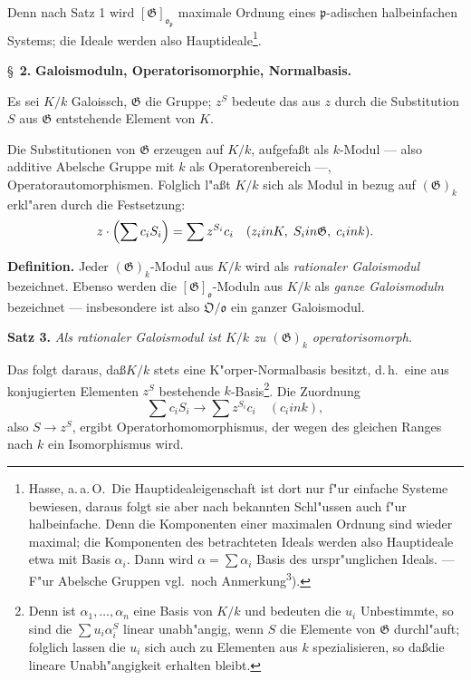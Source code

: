 \documentclass[12pt,a4paper]{article}
\theoremstyle{plain}
\begin{document}
Denn nach Satz 1 wird $[\mathfrak{G}]_{\mathfrak{o}_\mathfrak{p}}$ maximale Ordnung eines $\mathfrak{p}$-adischen halbeinfachen Systems; die Ideale werden also Hauptideale\footnote{Hasse, a.\,a.\,O.\ Die Hauptidealeigenschaft ist dort nur f"ur einfache Systeme bewiesen, daraus folgt sie aber nach bekannten Schl"ussen auch f"ur halbeinfache. Denn die Komponenten einer maximalen Ordnung sind wieder maximal; die Komponenten des betrachteten Ideals werden also Hauptideale etwa mit Basis $\alpha_i$. Dann wird $\alpha = \sum \alpha_i$ Basis des urspr"unglichen Ideals. --- F"ur Abelsche Gruppen vgl.\ noch Anmerkung\textsuperscript{3}).}.

\newpage
\S~\textbf{2.}
\textbf{Galoismoduln, Operatorisomorphie, Normalbasis.}

\smallskip

Es sei $K/k$ Galoissch, $\mathfrak{G}$ die Gruppe; $z^S$ bedeute das aus $z$ durch die Substitution $S$ aus $\mathfrak{G}$ entstehende Element von $K$.

Die Substitutionen von $\mathfrak{G}$ erzeugen auf $K/k$, aufgefa\ss t als $k$-Modul --- also additive Abelsche Gruppe mit $k$ als Operatorenbereich ---, Operatorautomorphismen. Folglich l"a\ss t $K/k$ sich als Modul in bezug auf $(\mathfrak{G})_k$ erkl"aren durch die Festsetzung:
\[
z \cdot \Bigl(\sum c_i S_i\Bigr) = \sum z^{S_i} c_i
\quad (z_i { in } K,\; S_i { in } \mathfrak{G},\; c_i { in } k).
\]

\noindent\textbf{Definition.}
Jeder $(\mathfrak{G})_k$-Modul aus $K/k$ wird als \textit{rationaler Galoismodul} bezeichnet. Ebenso werden die $[\mathfrak{G}]_\mathfrak{o}$-Moduln aus $K/k$ als \textit{ganze Galoismoduln} bezeichnet --- insbesondere ist also $\mathfrak{O}/\mathfrak{o}$ ein ganzer Galoismodul.

\medskip\noindent\textbf{Satz 3.}
\textit{Als rationaler Galoismodul ist $K/k$ zu $(\mathfrak{G})_k$ operatorisomorph.}

Das folgt daraus, da\ss $K/k$ stets eine K"orper-Normalbasis besitzt, d.\,h.\ eine aus konjugierten Elementen $z^S$ bestehende $k$-Basis\footnote{Denn ist $\alpha_1,\ldots,\alpha_n$ eine Basis von $K/k$ und bedeuten die $u_i$ Unbestimmte, so sind die $\sum u_i \alpha_i^S$ linear unabh"angig, wenn $S$ die Elemente von $\mathfrak{G}$ durchl"auft; folglich lassen die $u_i$ sich auch zu Elementen aus $k$ spezialisieren, so da\ss die lineare Unabh"angigkeit erhalten bleibt.}. Die Zuordnung
\[
\sum c_i S_i \to \sum z^{S_i} c_i\quad (c_i { in } k),
\]
also $S \to z^S$, ergibt Operatorhomomorphismus, der wegen des gleichen Ranges nach $k$ ein Isomorphismus wird.
\end{document}

